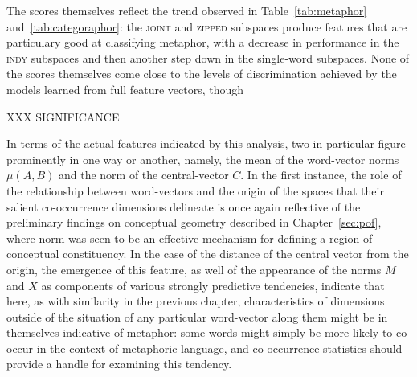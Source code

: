The scores themselves reflect the trend observed in Table~\ref{tab:metaphor} and~\ref{tab:categoraphor}: the \textsc{joint} and \textsc{zipped} subspaces produce features that are particulary good at classifying metaphor, with a decrease in performance in the \textsc{indy} subspaces and then another step down in the single-word subspaces.  None of the scores themselves come close to the levels of discrimination achieved by the models learned from full feature vectors, though

XXX SIGNIFICANCE

In terms of the actual features indicated by this analysis, two in particular figure prominently in one way or another, namely, the mean of the word-vector norms $\mu(A,B)$ and the norm of the central-vector $C$.  In the first instance, the role of the relationship between word-vectors and the origin of the spaces that their salient co-occurrence dimensions delineate is once again reflective of the preliminary findings on conceptual geometry described in Chapter~\ref{sec:pof}, where norm was seen to be an effective mechanism for defining a region of conceptual constituency.  In the case of the distance of the central vector from the origin, the emergence of this feature, as well of the appearance of the norms $M$ and $X$ as components of various strongly predictive tendencies, indicate that here, as with similarity in the previous chapter, characteristics of dimensions outside of the situation of any particular word-vector along them might be in themselves indicative of metaphor: some words might simply be more likely to co-occur in the context of metaphoric language, and co-occurrence statistics should provide a handle for examining this tendency.

